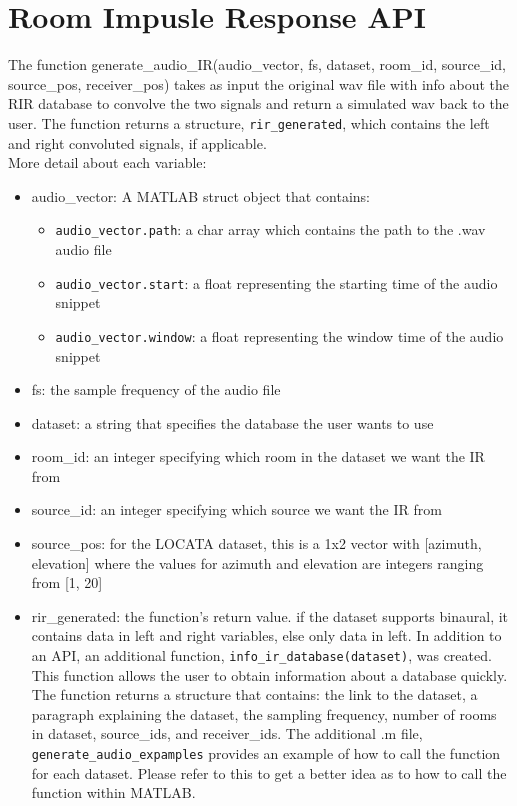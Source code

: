 \documentclass{article}
\begin{document}
\section{Room Impusle Response API}
The function generate\_audio\_IR(audio\_vector, fs, dataset, room\_id, source\_id, source\_pos, receiver\_pos) takes as input the original wav file with info about the RIR database to convolve the two signals and return a simulated wav back to the user. The function returns a structure, \texttt{rir\_generated}, which contains the left and right convoluted signals, if applicable.\\ More detail about each variable:
\begin{itemize}
    \item audio\_vector: A MATLAB struct object that contains: 
    \begin{itemize}
        \item \texttt{audio\_vector.path}: a char array which contains the path to the .wav audio file
        \item \texttt{audio\_vector.start}: a float representing the starting time of the audio snippet
        \item \texttt{audio\_vector.window}: a float representing the window time of the audio snippet
    \end{itemize}
    \item fs: the sample frequency of the audio file
    \item dataset: a string that specifies the database the user wants to use
    \item room\_id: an integer specifying which room in the dataset we want the IR from
    \item source\_id: an integer specifying which source we want the IR from
    \item source\_pos: for the LOCATA dataset, this is a 1x2 vector with [azimuth, elevation] where the values for azimuth and elevation are integers ranging from [1, 20]
    \item rir\_generated: the function's return value. if the dataset supports binaural, it contains data in left and right variables, else only data in left. In addition to an API, an additional function, \texttt{info\_ir\_database(dataset)}, was created. This function allows the user to obtain information about a database quickly. The function returns a structure that contains: the link to the dataset, a paragraph explaining the dataset, the sampling frequency, number of rooms in dataset, source\_ids, and receiver\_ids. The additional .m file, \texttt{generate\_audio\_expamples} provides an example of how to call the function for each dataset. Please refer to this to get a better idea as to how to call the function within MATLAB.
\end{itemize}
\end{document}

